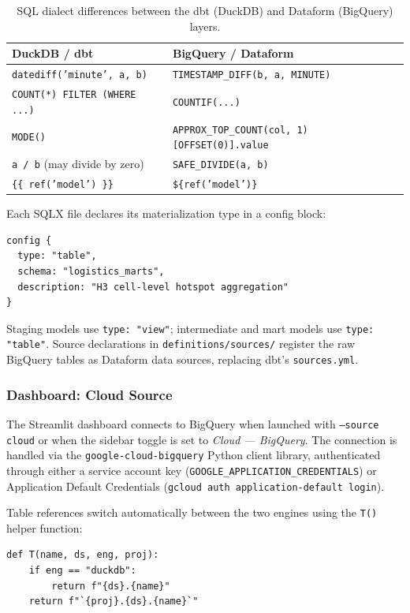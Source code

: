 \begin{table}[H]
\centering
\begin{tabular}{ll}
\hline
\textbf{DuckDB / dbt} & \textbf{BigQuery / Dataform} \\
\hline
\texttt{datediff('minute', a, b)} & \texttt{TIMESTAMP\_DIFF(b, a, MINUTE)} \\
\texttt{COUNT(*) FILTER (WHERE ...)} & \texttt{COUNTIF(...)} \\
\texttt{MODE()} & \texttt{APPROX\_TOP\_COUNT(col, 1)[OFFSET(0)].value} \\
\texttt{a / b} (may divide by zero) & \texttt{SAFE\_DIVIDE(a, b)} \\
\texttt{\{\{ ref('model') \}\}} & \texttt{\$\{ref('model')\}} \\
\hline
\end{tabular}
\caption{SQL dialect differences between the dbt (DuckDB) and Dataform (BigQuery) layers.}
\label{tab:sql_dialect}
\end{table}

Each SQLX file declares its materialization type in a config block:

\begin{verbatim}
config {
  type: "table",
  schema: "logistics_marts",
  description: "H3 cell-level hotspot aggregation"
}
\end{verbatim}

Staging models use \texttt{type: "view"}; intermediate and mart models use
\texttt{type: "table"}. Source declarations in \texttt{definitions/sources/} register
the raw BigQuery tables as Dataform data sources, replacing dbt's \texttt{sources.yml}.

\subsubsection{Dashboard: Cloud Source}

The Streamlit dashboard connects to BigQuery when launched with \texttt{--source cloud}
or when the sidebar toggle is set to \textit{Cloud --- BigQuery}. The connection is
handled via the \texttt{google-cloud-bigquery} Python client library, authenticated
through either a service account key (\texttt{GOOGLE\_APPLICATION\_CREDENTIALS}) or
Application Default Credentials (\texttt{gcloud auth application-default login}).

Table references switch automatically between the two engines using the \texttt{T()}
helper function:

\begin{verbatim}
def T(name, ds, eng, proj):
    if eng == "duckdb":
        return f"{ds}.{name}"
    return f"`{proj}.{ds}.{name}`"
\end{verbatim}

